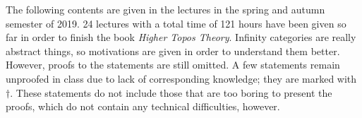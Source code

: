 The following contents are given in the lectures in the spring and autumn semester of 2019. 24 lectures with a total time of 121 hours 
have been given so far in order to finish the book \textit{Higher Topos Theory}. Infinity categories are really abstract things, 
so motivations are given in order to understand them better. However, proofs to the statements are still omitted. A few statements 
remain unproofed in class due to lack of corresponding knowledge; they are marked with $\dagger$. These statements do not include 
those that are too boring to present the proofs, which do not contain any technical difficulties, however. 